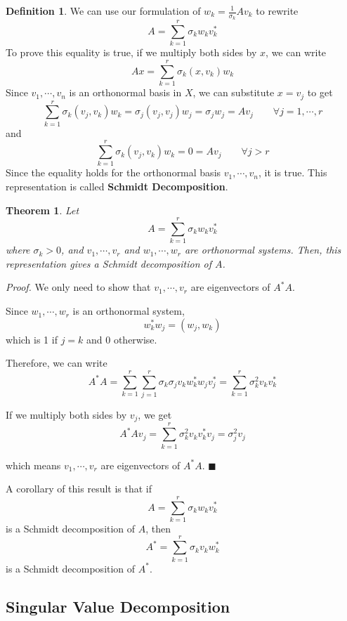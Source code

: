 \documentclass[a4paper,10pt]{book}
\theoremstyle{plain}
\newtheorem{theorem}{Theorem}[section]
\renewenvironment{proof}{\textsl{Proof.}}{\hfill$\blacksquare$}
\theoremstyle{plain}
\theoremstyle{definition}
\newtheorem{definition}{Definition}[section]
\begin{document}
\begin{definition}
We can use our formulation of $w_{k} = \frac{1}{\sigma_{k}} Av_{k}$ to rewrite 
$$A = \sum_{k = 1}^{r} \sigma_{k} w_{k} v_{k}^{*}$$
To prove this equality is true, if we multiply both sides by $x$, we can write 
$$Ax = \sum_{k = 1}^{r} \sigma_{k} (x, v_{k}) w_{k}$$
Since $v_{1}, \cdots, v_{n}$ is an orthonormal basis in $X$, we can substitute $x = v_{j}$ to get 
$$\sum_{k = 1}^{r} \sigma_{k} (v_{j}, v_{k}) w_{k} = \sigma_{j} (v_{j}, v_{j}) w_{j} = \sigma_{j} w_{j} = Av_{j} \qquad \forall j = 1, \cdots, r$$
and 
$$\sum_{k = 1}^{r} \sigma_{k} (v_{j}, v_{k}) w_{k} = 0 = Av_{j} \qquad \forall j > r$$
Since the equality holds for the orthonormal basis $v_{1}, \cdots, v_{n}$, it is true. This representation is called \textbf{Schmidt Decomposition}.
\end{definition}

\begin{theorem}
Let
$$A = \sum_{k=1}^{r} \sigma_{k} w_{k} v_{k}^{*}$$
where $\sigma_{k} > 0$, and $v_{1}, \cdots, v_{r}$ and $w_{1}, \cdots, w_{r}$ are orthonormal systems. Then, this representation gives a Schmidt decomposition of $A$. 
\end{theorem}

\begin{proof}
We only need to show that $v_{1}, \cdots, v_{r}$ are eigenvectors of $A^{*}A$. 

Since $w_{1}, \cdots, w_{r}$ is an orthonormal system, 
$$w_{k}^{*} w_{j} = (w_{j}, w_{k})$$ 
which is 1 if $j = k$ and 0 otherwise. 

Therefore, we can write 
$$A^{*} A = \sum_{k=1}^{r} \sum_{j=1}^{r} \sigma_{k} \sigma_{j}    v_{k} w_{k}^{*} w_{j} v_{j}^{*} = \sum_{k=1}^{r} \sigma_{k}^{2} v_{k} v_{k}^{*}$$

If we multiply both sides by $v_{j}$, we get 
$$A^{*} A v_{j} = \sum_{k=1}^{r} \sigma_{k}^{2} v_{k} v_{k}^{*}v_{j} = \sigma_{j}^{2} v_{j}$$

which means $v_{1}, \cdots, v_{r}$ are eigenvectors of $A^{*} A$. 
\end{proof}

A corollary of this result is that if 
$$A = \sum_{k=1}^{r} \sigma_{k} w_{k} v_{k}^{*}$$
is a Schmidt decomposition of $A$, then 
$$A^{*} = \sum_{k=1}^{r} \sigma_{k} v_{k} w_{k}^{*}$$
is a Schmidt decomposition of $A^{*}$. 

\subsection{Singular Value Decomposition}
\end{document}
